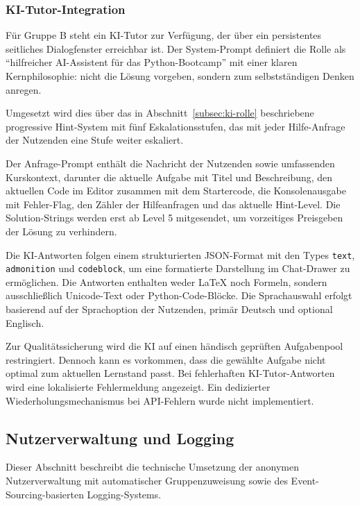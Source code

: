 \subsubsection{KI-Tutor-Integration}

Für Gruppe B steht ein KI-Tutor zur Verfügung, der über ein persistentes seitliches Dialogfenster erreichbar ist.
Der System-Prompt definiert die Rolle als \enquote{hilfreicher AI-Assistent für das Python-Bootcamp} mit einer klaren Kern\-philosophie: nicht die Lösung vorgeben, sondern zum selbst\-ständigen Denken anregen.

Umgesetzt wird dies über das in Abschnitt~\ref{subsec:ki-rolle} beschriebene progressive Hint-System mit fünf Eskalationsstufen, das mit jeder Hilfe-Anfrage der Nutzenden eine Stufe weiter eskaliert.

Der Anfrage-Prompt enthält die Nachricht der Nutzenden sowie umfassenden Kurskontext, darunter die aktuelle Aufgabe mit Titel und Beschreibung, den aktuellen Code im Editor zusammen mit dem Startercode, die Konsolenausgabe mit Fehler-Flag, den Zähler der Hilfeanfragen und das aktuelle Hint-Level.
Die Solution-Strings werden erst ab Level 5 mitgesendet, um vorzeitiges Preisgeben der Lösung zu verhindern.

Die KI-Antworten folgen einem strukturierten JSON-Format mit den Types \texttt{text}, \texttt{admonition} und \texttt{codeblock}, um eine formatierte Darstellung im Chat-Drawer zu ermöglichen.
Die Antworten enthalten weder LaTeX noch Formeln, sondern ausschließlich Unicode-Text oder Python-Code-Blöcke.
Die Sprachauswahl erfolgt basierend auf der Sprachoption der Nutzenden, primär Deutsch und optional Englisch.

Zur Qualitätssicherung wird die KI auf einen händisch geprüften Aufgabenpool restringiert.
Dennoch kann es vorkommen, dass die gewählte Aufgabe nicht optimal zum aktuellen Lernstand passt.
Bei fehlerhaften KI-Tutor-Antworten wird eine lokalisierte Fehlermeldung angezeigt.
Ein dedizierter Wiederholungsmechanismus bei API-Fehlern wurde nicht implementiert. 

\subsection{Nutzerverwaltung und Logging}\label{subsec:logging}

Dieser Abschnitt beschreibt die technische Umsetzung der anonymen Nutzerverwaltung mit automatischer Gruppenzuweisung sowie des Event-Sourcing-basierten Logging-Systems.

